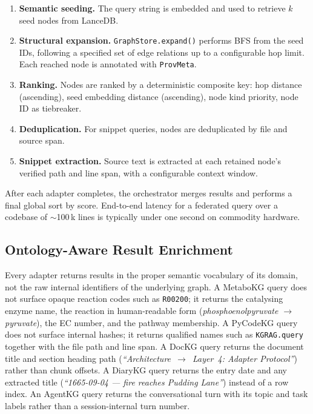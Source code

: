 \documentclass[10pt]{article}
\begin{document}
\begin{enumerate}
  \item \textbf{Semantic seeding.} The query string is embedded and used to
    retrieve $k$ seed nodes from LanceDB.
  \item \textbf{Structural expansion.} \texttt{GraphStore.expand()} performs
    BFS from the seed IDs, following a specified set of edge relations up to
    a configurable hop limit. Each reached node is annotated with
    \texttt{ProvMeta}.
  \item \textbf{Ranking.} Nodes are ranked by a deterministic composite key:
    hop distance (ascending), seed embedding distance (ascending), node kind
    priority, node ID as tiebreaker.
  \item \textbf{Deduplication.} For snippet queries, nodes are deduplicated by
    file and source span.
  \item \textbf{Snippet extraction.} Source text is extracted at each retained
    node's verified path and line span, with a configurable context window.
\end{enumerate}

After each adapter completes, the orchestrator merges results and performs a
final global sort by score. End-to-end latency for a federated query over a
codebase of $\sim$100\,k lines is typically under one second on commodity hardware.

\subsection{Ontology-Aware Result Enrichment}

Every adapter returns results in the proper semantic vocabulary of its domain,
not the raw internal identifiers of the underlying graph. A MetaboKG query
does not surface opaque reaction codes such as \texttt{R00200}; it returns
the catalysing enzyme name, the reaction in human-readable form
(\emph{phosphoenolpyruvate $\rightarrow$ pyruvate}), the EC number, and the
pathway membership. A PyCodeKG query does not surface internal hashes; it
returns qualified names such as \texttt{KGRAG.query} together with the file
path and line span. A DocKG query returns the document title and section
heading path (\emph{``Architecture~$\rightarrow$~Layer~4: Adapter Protocol''})
rather than chunk offsets. A DiaryKG query returns the entry date and any
extracted title (\emph{``1665-09-04 — fire reaches Pudding Lane''}) instead
of a row index. An AgentKG query returns the conversational turn with its
topic and task labels rather than a session-internal turn number.
\end{document}
